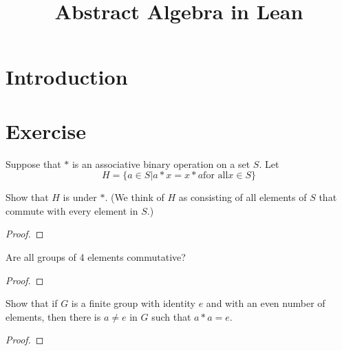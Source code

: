 \title{Abstract Algebra in Lean}




\maketitle


\tableofcontents
\section{Introduction}



\section{Exercise}

\nocite{*} %

\begin{theorem}[Exercise 1]\label{Ex1}
  \leanok
    Suppose that $*$ is an associative binary operation on a set $S$. Let
    $$
    H = \{a\in S | a * x = x * a \text{for all} x\in S\}
    $$

    Show that $H$ is under $*$. (We think of $H$ as consisting of all elements of $S$ that commute with every element in $S$.)
\end{theorem}
\begin{proof}
  \leanok
\end{proof}


\begin{theorem}[Exercise 2]\label{Ex2}
  \leanok
    Are all groups of 4 elements commutative?
\end{theorem}
\begin{proof}
  \leanok
\end{proof}


\begin{theorem}[Exercise 3]\label{Ex3}
  \leanok
    Show that if $G$ is a finite group with identity $e$ and with an even number of elements, then there is $a \ne e$ in $G$ such that $a * a = e$.
\end{theorem}
\begin{proof}
  \leanok
\end{proof}


